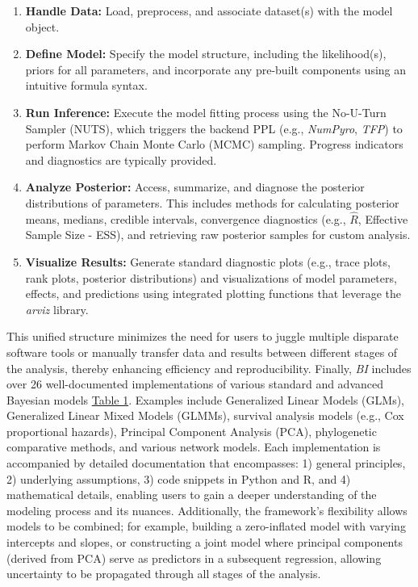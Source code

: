 \documentclass[blind,lineno,num-refs]{wiley-article}
\begin{document}
\begin{enumerate}
  \item  \textbf{Handle Data:} Load, preprocess, and associate dataset(s) with the model object.
 
  \item  \textbf{Define Model:} Specify the model structure, including the likelihood(s), priors for all parameters, and incorporate any pre-built components using an intuitive formula syntax.
  \item  \textbf{Run Inference:} Execute the model fitting process using the No-U-Turn Sampler (NUTS), which triggers the backend PPL (e.g., \textit{NumPyro}, \textit{TFP}) to perform Markov Chain Monte Carlo (MCMC) sampling. Progress indicators and diagnostics are typically provided.
 
  \item  \textbf{Analyze Posterior:} Access, summarize, and diagnose the posterior distributions of parameters. This includes methods for calculating posterior means, medians, credible intervals, convergence diagnostics (e.g., $\hat{R}$, Effective Sample Size - ESS), and retrieving raw posterior samples for custom analysis.
  
  \item  \textbf{Visualize Results:} Generate standard diagnostic plots (e.g., trace plots, rank plots, posterior distributions) and visualizations of model parameters, effects, and predictions using integrated plotting functions that leverage the \textit{arviz} library.
\end{enumerate}

 This unified structure minimizes the need for users to juggle multiple disparate software tools or manually transfer data and results between different stages of the analysis, thereby enhancing efficiency and reproducibility. Finally, \textit{BI} includes over 26 well-documented implementations of various standard and advanced Bayesian models \hyperlink{tab1}{Table 1}. Examples include Generalized Linear Models (GLMs), Generalized Linear Mixed Models (GLMMs), survival analysis models (e.g., Cox proportional hazards), Principal Component Analysis (PCA), phylogenetic comparative methods, and various network models. Each implementation is accompanied by detailed documentation that encompasses: 1) general principles, 2) underlying assumptions, 3) code snippets in Python and R, and 4) mathematical details, enabling users to gain a deeper understanding of the modeling process and its nuances. Additionally, the framework's flexibility allows models to be combined; for example, building a zero-inflated model with varying intercepts and slopes, or constructing a joint model where principal components (derived from PCA) serve as predictors in a subsequent regression, allowing uncertainty to be propagated through all stages of the analysis.
\end{document}

